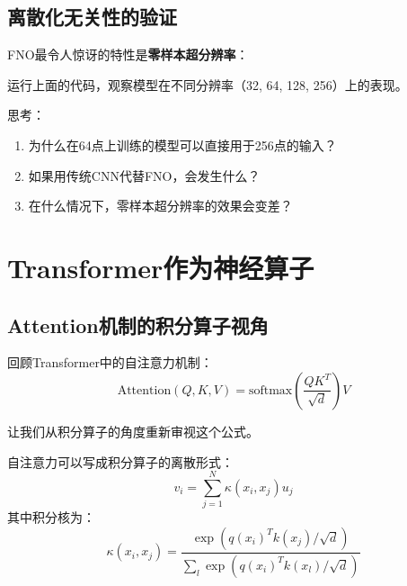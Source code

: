 \subsection{离散化无关性的验证}

FNO最令人惊讶的特性是\textbf{零样本超分辨率}：

\begin{exercise}[title = 验证离散化无关性]
运行上面的代码，观察模型在不同分辨率（32, 64, 128, 256）上的表现。

思考：
\begin{enumerate}
    \item 为什么在64点上训练的模型可以直接用于256点的输入？
    \item 如果用传统CNN代替FNO，会发生什么？
    \item 在什么情况下，零样本超分辨率的效果会变差？
\end{enumerate}
\end{exercise}

\section{Transformer作为神经算子}
\label{sec:transformer_operator}

\subsection{Attention机制的积分算子视角}

回顾Transformer中的自注意力机制：
\begin{equation}
    \text{Attention}(Q, K, V) = \text{softmax}\left(\frac{QK^T}{\sqrt{d}}\right) V
\end{equation}

让我们从积分算子的角度重新审视这个公式。

\begin{proposition}[Attention作为积分算子]
自注意力可以写成积分算子的离散形式：
\begin{equation}
    v_i = \sum_{j=1}^{N} \kappa(x_i, x_j) u_j
\end{equation}
其中积分核为：
\begin{equation}
    \kappa(x_i, x_j) = \frac{\exp\left(q(x_i)^T k(x_j) / \sqrt{d}\right)}{\sum_l \exp\left(q(x_i)^T k(x_l) / \sqrt{d}\right)}
\end{equation}
\end{proposition}

